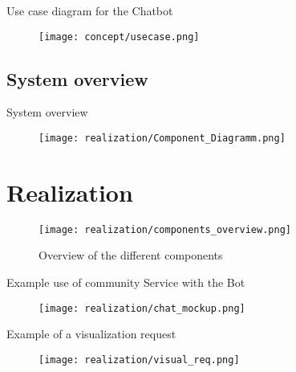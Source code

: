 \begin{frame}{Use case diagram for the Chatbot}
  \begin{figure}
    \centering
    \texttt{[image: concept/usecase.png]}

  \end{figure}
\end{frame}

\subsection{System overview}

\begin{frame}{System overview}
  \begin{figure}
    \centering
    \texttt{[image: realization/Component\_Diagramm.png]}

    \label{fig:sytsemOverview}
  \end{figure}
\end{frame}

\section{Realization}

\begin{frame}
  \begin{figure}
    \centering
    \texttt{[image: realization/components\_overview.png]}
    \caption{Overview of the different components}
    \label{fig:componentsOverview}
  \end{figure}
\end{frame}

\begin{frame}{Example use of community Service with the Bot}
  \begin{figure}
    \centering
    \texttt{[image: realization/chat\_mockup.png]}

  \end{figure}
\end{frame}

\begin{frame}{Example of a visualization request}
  \begin{figure}
    \centering
    \texttt{[image: realization/visual\_req.png]}

    \label{fig:visualReq}
  \end{figure}
\end{frame}

